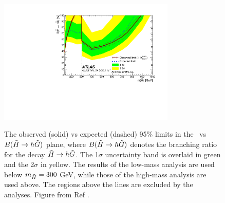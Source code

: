 \begin{figure}[htbp]    
	\centering    
    \includegraphics[width=0.75\textwidth]{figures/ewk_prod/interpretation/my_br_plot_unblind_yellow_band}\label{fig:exclusion_br}
	\caption{The observed (solid) vs expected (dashed) 95\% limits in the \mhino\ vs $B(\tilde{H}\rightarrow h \tilde{G})$ plane, where $B(\tilde{H}\rightarrow h \tilde{G})$ denotes the branching ratio for the decay $\tilde{H} \rightarrow h \tilde{G}$. The 1$\sigma$ uncertainty band is overlaid in green and the 2$\sigma$ in yellow.
	The results of the low-mass analysis are used below $m_{\tilde{H}} = 300$ GeV, while those of the high-mass analysis are used above.
	 The regions above the lines are excluded by the analyses. Figure from Ref \cite{Aaboud:2018htj}. } 
	\label{fig:exclusion}
\end{figure}


